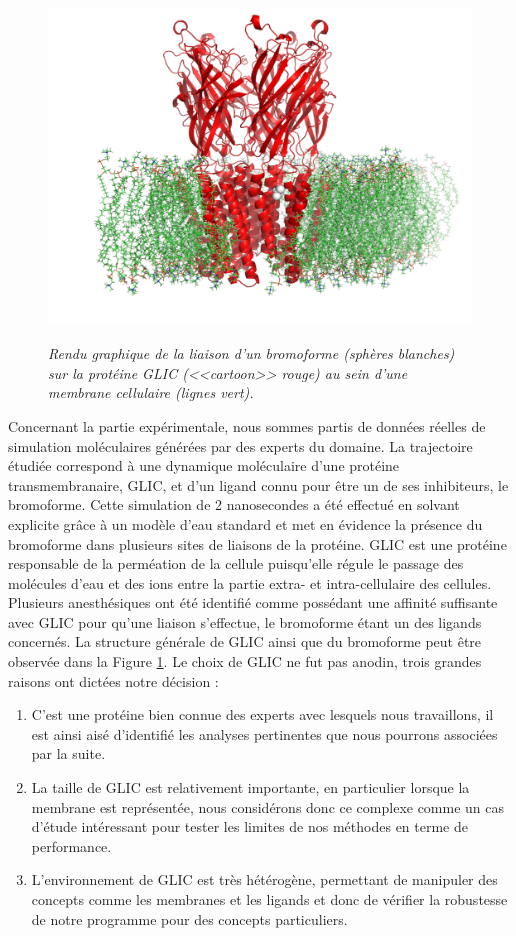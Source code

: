 \begin{figure}
  \centering
  {\includegraphics[width=.75\linewidth]{./figures/ch5/glic+bromoform.pdf}}
    \caption[Rendu graphique de GLIC et son ligand.]{{\it Rendu graphique de la liaison d'un bromoforme (sphères blanches) sur la protéine GLIC (<<cartoon>> rouge) au sein d'une membrane cellulaire (lignes vert).}}
  \label{Fig:glic+bromoform}
  \hspace{0.3cm}
\end{figure}

Concernant la partie expérimentale, nous sommes partis de données réelles de simulation moléculaires générées par des experts du domaine. La trajectoire étudiée correspond à une dynamique moléculaire d'une protéine transmembranaire, GLIC, et d'un ligand connu pour être un de ses inhibiteurs, le bromoforme. Cette simulation de 2 nanosecondes a été effectué en solvant explicite grâce à un modèle d'eau standard et met en évidence la présence du bromoforme dans plusieurs sites de liaisons de la protéine. GLIC est une protéine responsable de la perméation de la cellule puisqu'elle régule le passage des molécules d'eau et des ions entre la partie extra- et intra-cellulaire des cellules. Plusieurs anesthésiques ont été identifié comme possédant une affinité suffisante avec GLIC pour qu'une liaison s'effectue, le bromoforme étant un des ligands concernés. La structure générale de GLIC ainsi que du bromoforme peut être observée dans la Figure \ref{Fig:glic+bromoform}. Le choix de GLIC ne fut pas anodin, trois grandes raisons ont dictées notre décision :
\begin{enumerate}
	\item C'est une protéine bien connue des experts avec lesquels nous travaillons, il est ainsi aisé d'identifié les analyses pertinentes que nous pourrons associées par la suite.
	\item La taille de GLIC est relativement importante, en particulier lorsque la membrane est représentée, nous considérons donc ce complexe comme un cas d'étude intéressant pour tester les limites de nos méthodes en terme de performance.
	\item L'environnement de GLIC est très hétérogène, permettant de manipuler des concepts comme les membranes et les ligands et donc de vérifier la robustesse de notre programme pour des concepts particuliers.
\end{enumerate}

